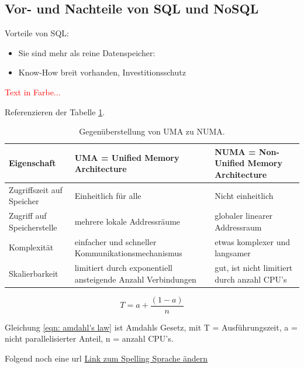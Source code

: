 \subsection{Vor- und Nachteile von SQL und NoSQL}

Vorteile von SQL:
\begin{itemize}
	\item Sie sind mehr als reine Datenspeicher:
	\item Know-How breit vorhanden, Investitionsschutz
\end{itemize}


\textcolor{red}{Text in Farbe...}

Referenzieren der Tabelle \ref{tab:UMA vs NUMA}.


\begin{table}[h]
\centering
\begin{tabular}{p{4cm} |p{5cm} |p{5cm} }
	\toprule
	\textbf{Eigenschaft} & \textbf{UMA = Unified Memory Architecture} & \textbf{NUMA = Non-Unified Memory Architecture}\\
	\midrule
	Zugriffszeit auf Speicher & Einheitlich für alle & Nicht einheitlich \\
	\midrule
	Zugriff auf Speicherstelle & mehrere lokale Addressräume  & globaler linearer Addressraum\\
	\midrule
	Komplexität & einfacher und schneller Kommunikationsmechanismus & etwas komplexer und langsamer \\
	\midrule
	Skalierbarkeit & limitiert durch exponentiell ansteigende Anzahl Verbindungen & gut, ist nicht limitiert durch anzahl CPU's \\
	\bottomrule
\end{tabular}
\caption{Gegenüberstellung von UMA zu NUMA.}
\label{tab:UMA vs NUMA}
\end{table}

\begin{equation} \label{eqn: amdahl's law}
T = a + \frac{\left(1-a\right)}{n} 
\end{equation}

Gleichung \ref{eqn: amdahl's law} ist Amdahls Gesetz, mit T = Ausführungszeit, a = nicht parallelisierter Anteil, n = anzahl CPU's.

Folgend noch eine url \href{https://tex.stackexchange.com/questions/495020/how-do-i-change-the-spellcheck-language-of-texmaker-to-us-english}{Link zum Spelling Sprache ändern}